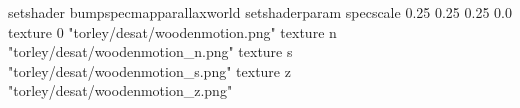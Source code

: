 setshader bumpspecmapparallaxworld
setshaderparam specscale 0.25 0.25 0.25 0.0
texture 0 "torley/desat/woodenmotion.png"
texture n "torley/desat/woodenmotion_n.png"
texture s "torley/desat/woodenmotion_s.png"
texture z "torley/desat/woodenmotion_z.png"

